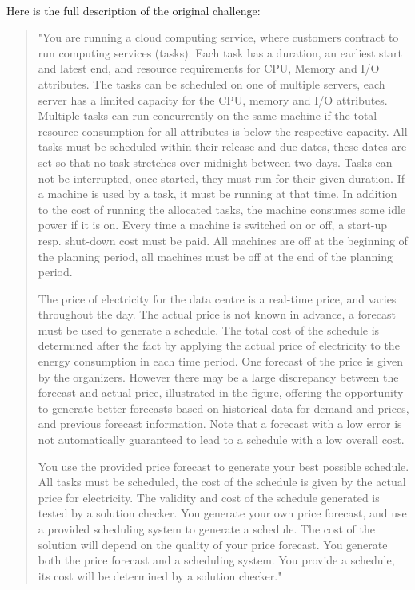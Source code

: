 \documentclass[a4,12pt]{article}
\begin{document}
\paragraph{}
Here is the full description of the original challenge:
\begin{quotation}
"You are running a cloud computing service, where customers contract to run computing services (tasks). Each task has a duration, an earliest start and latest end, and resource requirements for CPU, Memory and I/O attributes. The tasks can be scheduled on one of multiple servers, each server has a limited capacity for the CPU, memory and I/O attributes. Multiple tasks can run concurrently on the same machine if the total resource consumption for all attributes is below the respective capacity. All tasks must be scheduled within their release and due dates, these dates are set so that no task stretches over midnight between two days. Tasks can not be interrupted, once started, they must run for their given duration. If a machine is used by a task, it must be running at that time. In addition to the cost of running the allocated tasks, the machine consumes some idle power if it is on. Every time a machine is switched on or off, a start-up resp. shut-down cost must be paid. All machines are off at the beginning of the planning period, all machines must be off at the end of the planning period.

The price of electricity for the data centre is a real-time price, and varies throughout the day. The actual price is not known in advance, a forecast must be used to generate a schedule. The total cost of the schedule is determined after the fact by applying the actual price of electricity to the energy consumption in each time period. One forecast of the price is given by the organizers. However there may be a large discrepancy between the forecast and actual price, illustrated in the figure, offering the opportunity to generate better forecasts based on historical data for demand and prices, and previous forecast information. Note that a forecast with a low error is not automatically guaranteed to lead to a schedule with a low overall cost.

You use the provided price forecast to generate your best possible schedule. All tasks must be scheduled, the cost of the schedule is given by the actual price for electricity. The validity and cost of the schedule generated is tested by a solution checker. You generate your own price forecast, and use a provided scheduling system to generate a schedule. The cost of the solution will depend on the quality of your price forecast. You generate both the price forecast and a scheduling system. You provide a schedule, its cost will be determined by a solution checker."
\end{quotation}
\end{document}
